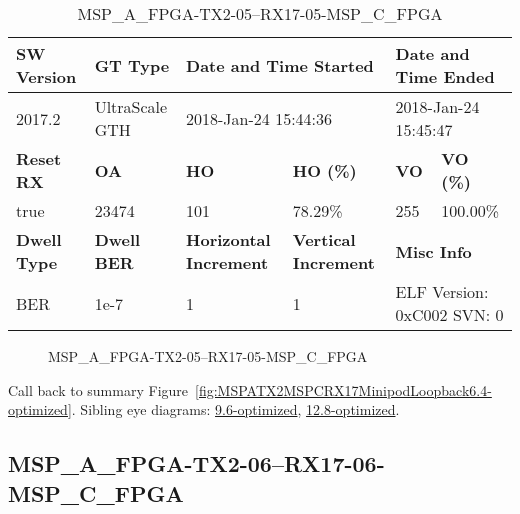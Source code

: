 \begin{table}[h]
\centering
\caption{MSP\_A\_FPGA-TX2-05--RX17-05-MSP\_C\_FPGA}
\label{tab:MSPAFPGATX205RX1705MSPCFPGA6.4-optimized}
\begin{tabular}{@{}|l|l|l|l|l|l|@{}}
\toprule
\textbf{SW Version}                & \textbf{GT Type}   & \multicolumn{2}{l|}{\textbf{Date and Time Started}}            & \multicolumn{2}{l|}{\textbf{Date and Time Ended}}        \\ \midrule
2017.2                       & UltraScale GTH          & \multicolumn{2}{l|}{2018-Jan-24 15:44:36}                   & \multicolumn{2}{l|}{2018-Jan-24 15:45:47}               \\ \midrule
\textbf{Reset RX}                  & \textbf{OA} & \textbf{HO}   & \textbf{HO (\%)} & \textbf{VO} & \textbf{VO (\%)} \\ \midrule
true & 23474        & 101          & 78.29\%        & 255        & 100.00\%       \\ \midrule
\textbf{Dwell Type}                & \textbf{Dwell BER} & \textbf{Horizontal Increment} & \textbf{Vertical Increment}    & \multicolumn{2}{l|}{\textbf{Misc Info}}                  \\ \midrule
BER                            & 1e-7        & 1        & 1           & \multicolumn{2}{l|}{ELF Version: 0xC002 SVN: 0}                         \\ \bottomrule
\end{tabular}
\end{table}

\begin{figure}[h]
\caption{MSP\_A\_FPGA-TX2-05--RX17-05-MSP\_C\_FPGA} \label{fig:MSPAFPGATX205RX1705MSPCFPGA6.4-optimized}
\end{figure}

Call back to summary Figure~\ref{fig:MSPATX2MSPCRX17MinipodLoopback6.4-optimized}.
Sibling eye diagrams: \hyperref[sec:MSPAFPGATX205RX1705MSPCFPGA9.6-optimized]{9.6-optimized}, \hyperref[sec:MSPAFPGATX205RX1705MSPCFPGA12.8-optimized]{12.8-optimized}.

\clearpage
\newpage


\subsection{MSP\_A\_FPGA-TX2-06--RX17-06-MSP\_C\_FPGA}\label{sec:MSPAFPGATX206RX1706MSPCFPGA6.4-optimized}

